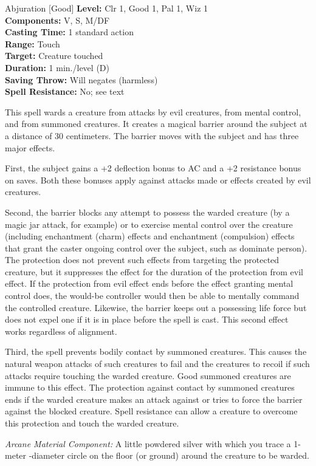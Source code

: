 {Abjuration [Good]}
{
	\textbf{Level:}
	Clr 1, Good 1, Pal 1, Wiz 1\\
	\textbf{Components:}
	V, S, M/DF\\
	\textbf{Casting Time:}
	1 standard action\\
	\textbf{Range:}
	Touch\\
	\textbf{Target:}
	Creature touched\\
	\textbf{Duration:}
	1 min./level (D)\\
	\textbf{Saving Throw:}
	Will negates (harmless)\\
	\textbf{Spell Resistance:}
	No; see text\\
}
{
	This spell wards a creature from attacks by evil creatures, from mental control, and from summoned creatures. It creates a magical barrier around the subject at a distance of 30 centimeters. The barrier moves with the subject and has three major effects.

	First, the subject gains a +2 deflection bonus to AC and a +2 resistance bonus on saves. Both these bonuses apply against attacks made or effects created by evil creatures.

	Second, the barrier blocks any attempt to possess the warded creature (by a magic jar attack, for example) or to exercise mental control over the creature (including enchantment (charm) effects and enchantment (compulsion) effects that grant the caster ongoing control over the subject, such as dominate person). The protection does not prevent such effects from targeting the protected creature, but it suppresses the effect for the duration of the protection from evil effect. If the protection from evil effect ends before the effect granting mental control does, the would-be controller would then be able to mentally command the controlled creature. Likewise, the barrier keeps out a possessing life force but does not expel one if it is in place before the spell is cast. This second effect works regardless of alignment.

	Third, the spell prevents bodily contact by summoned creatures. This causes the natural weapon attacks of such creatures to fail and the creatures to recoil if such attacks require touching the warded creature. Good summoned creatures are immune to this effect. The protection against contact by summoned creatures ends if the warded creature makes an attack against or tries to force the barrier against the blocked creature. Spell resistance can allow a creature to overcome this protection and touch the warded creature.

	\textit{Arcane Material Component:}
	A little powdered silver with which you trace a 1-meter -diameter circle on the floor (or ground) around the creature to be warded.

}
